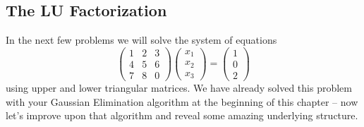 \subsection{The LU Factorization}
In the next few problems we will solve the system of equations
\[ \begin{pmatrix} 1 & 2 & 3 \\ 4 & 5 & 6 \\ 7 & 8 & 0 \end{pmatrix} \begin{pmatrix} x_1
    \\ x_2 \\ x_3 \end{pmatrix} = \begin{pmatrix} 1 \\ 0 \\ 2 \end{pmatrix} \]
using upper and lower triangular matrices.  We have already solved this problem with your
Gaussian Elimination algorithm at the beginning of this chapter -- now let's improve upon
that algorithm and reveal some amazing underlying structure.

